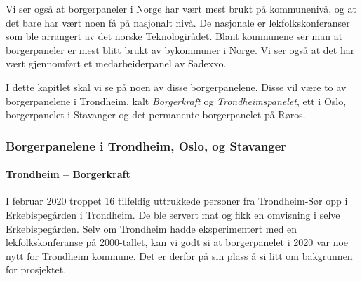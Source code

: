 \documentclass[
  12pt,
  a4paper, 12pt]{article}
\begin{document}
Vi ser også at borgerpaneler i Norge har vært mest brukt på kommunenivå, og at det bare har vært noen få på nasjonalt nivå. De nasjonale er lekfolkskonferanser som ble arrangert av det norske Teknologirådet. Blant kommunene ser man at borgerpaneler er mest blitt brukt av bykommuner i Norge. Vi ser også at det har vært gjennomført et medarbeiderpanel av Sadexxo.

I dette kapitlet skal vi se på noen av disse borgerpanelene. Disse vil være to av borgerpanelene i Trondheim, kalt \emph{Borgerkraft} og \emph{Trondheimspanelet}, ett i Oslo, borgerpanelet i Stavanger og det permanente borgerpanelet på Røros.

\hypertarget{borgerpanelene-i-trondheim-oslo-og-stavanger}{%
\subsubsection{Borgerpanelene i Trondheim, Oslo, og Stavanger}\label{borgerpanelene-i-trondheim-oslo-og-stavanger}}

\hypertarget{trondheim-borgerkraft}{%
\paragraph{Trondheim -- Borgerkraft}\label{trondheim-borgerkraft}}

I februar 2020 troppet 16 tilfeldig uttrukkede personer fra Trondheim-Sør opp i Erkebispegården i Trondheim. De ble servert mat og fikk en omvisning i selve Erkebispegården. Selv om Trondheim hadde eksperimentert med en lekfolkskonferanse på 2000-tallet, kan vi godt si at borgerpanelet i 2020 var noe nytt for Trondheim kommune. Det er derfor på sin plass å si litt om bakgrunnen for prosjektet.
\end{document}
